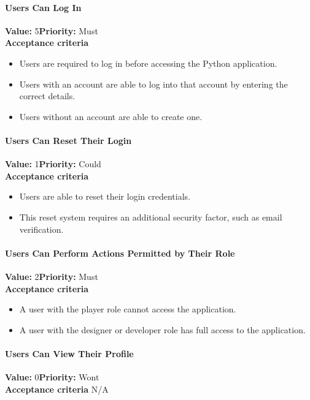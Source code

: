 \paragraph{Users Can Log In}
\textbf{Value:} 5\quad \textbf{Priority:} Must\\
\textbf{Acceptance criteria}
\begin{itemize}
  \item Users are required to log in before accessing the Python application.
  \item Users with an account are able to log into that account by entering the correct details.
  \item Users without an account are able to create one.
\end{itemize}

\paragraph{Users Can Reset Their Login}
\textbf{Value:} 1\quad \textbf{Priority:} Could\\
\textbf{Acceptance criteria}
\begin{itemize}
  \item Users are able to reset their login credentials.
  \item This reset system requires an additional security factor, such as email verification.
\end{itemize}

\paragraph{Users Can Perform Actions Permitted by Their Role}
\textbf{Value:} 2\quad \textbf{Priority:} Must\\
\textbf{Acceptance criteria}
\begin{itemize}
  \item A user with the player role cannot access the application.
  \item A user with the designer or developer role has full access to the application.
\end{itemize}

\paragraph{Users Can View Their Profile}
\textbf{Value:} 0\quad \textbf{Priority:} Wont\\
\textbf{Acceptance criteria} N/A

